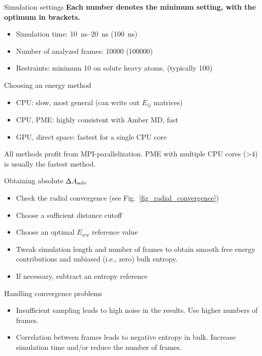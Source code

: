 \documentclass[9pt,tutorial]{livecoms}
\begin{document}
\begin{Checklists}[H]
	
	\begin{checklist}{Simulation settings}
		\textbf{Each number denotes the minimum setting, with the optimum in brackets.}
		\begin{itemize}
			\item Simulation time: \qtyrange{10}{20}{\nano\second} (\qty{100}{\nano\second})
			\item Number of analyzed frames: \num{10000} (\num{100000})
			\item Restraints: minimum \qty{10}{\kcalPerMolASqr} on solute heavy atoms. (typically \qty{100}{\kcalPerMolASqr})
		\end{itemize}
	\end{checklist}
	
	\begin{checklist}{Choosing an energy method}
		\begin{itemize}
			\item CPU: slow, most general (can write out $E_{ij}$ matrices)
			\item CPU, PME: highly consistent with Amber MD, fast
			\item GPU, direct space: fastest for a single CPU core
		\end{itemize}
	   
	All methods profit from MPI-parallelization.   
	PME with multiple CPU cores (>4) is usually the fastest method.
	\end{checklist}
	
	\begin{checklist}{Obtaining absolute $\Delta A_\textup{solv}$}
		\begin{itemize}
			\item Check the radial convergence (see Fig.~\ref{fig_radial_convergence})
			\item Choose a sufficient distance cutoff
			\item Choose an optimal $E_{ww}$ reference value
			\item Tweak simulation length and number of frames to obtain smooth free energy contributions and unbiased (i.e., zero) bulk entropy.
			\item If necessary, subtract an entropy reference
		\end{itemize}
	\end{checklist}
	
	\begin{checklist}{Handling convergence problems}
		\begin{itemize}
			\item Insufficient sampling leads to high noise in the results. Use higher numbers of frames.
			\item Correlation between frames leads to negative entropy in bulk. Increase simulation time and/or reduce the number of frames.
		\end{itemize}
	\end{checklist}
	

\end{Checklists}
\end{document}
